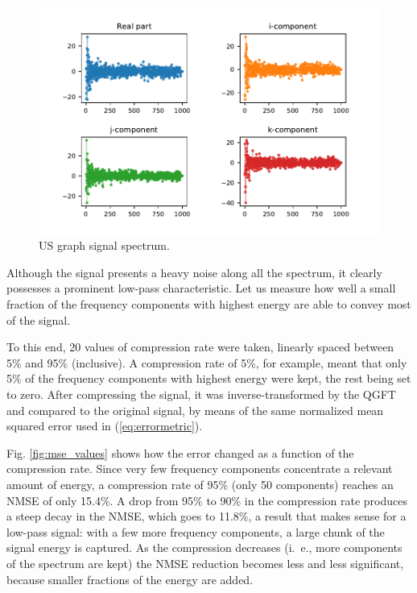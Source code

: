 \begin{figure}
\centering
\includegraphics[width=0.95\linewidth]{thesis/Figures/usa_example/us_counties_qgsp_spectrumsig.pdf}
\caption{US graph signal spectrum.}
\label{fig:us_counties_qgsp_spectrumsig}
\end{figure}

Although the signal presents a heavy noise along all the spectrum, it clearly possesses a prominent low-pass characteristic. Let us measure how well a small fraction of the frequency components with highest energy are able to convey most of the signal.

To this end, 20 values of compression rate were taken, linearly spaced between 5\% and 95\% (inclusive). A compression rate of 5\%, for example, meant that only 5\% of the frequency components with highest energy were kept, the rest being set to zero. After compressing the signal, it was inverse-transformed by the QGFT and compared to the original signal, by means of the same normalized mean squared error used in (\ref{eq:errormetric}).

Fig. \ref{fig:mse_values} shows how the error changed as a function of the compression rate. Since very few frequency components concentrate a relevant amount of energy, a compression rate of 95\% (only 50 components) reaches an NMSE of only 15.4\%. A drop from 95\% to 90\% in the compression rate produces a steep decay in the NMSE, which goes to 11.8\%, a result that makes sense for a low-pass signal: with a few more frequency components, a large chunk of the signal energy is captured. As the compression decreases (i.~e., more components of the spectrum are kept) the NMSE reduction becomes less and less significant, because smaller fractions of the energy are added.

